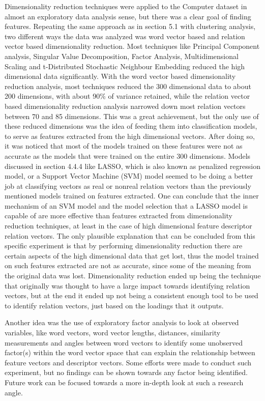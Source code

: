 \documentclass{sig-alternate}
\begin{document}
Dimensionality reduction techniques were applied to the Computer dataset in almost an exploratory data analysis sense, but there was a clear goal of finding features. Repeating the same approach as in section 5.1 with clustering analysis, two different ways the data was analyzed was word vector based and relation vector based dimensionality reduction. Most techniques like Principal Component analysis, Singular Value Decomposition, Factor Analysis, Multidimensional Scaling and t-Distributed Stochastic Neighbour Embedding reduced the high dimensional data significantly. With the word vector based dimensionality reduction analysis, most techniques reduced the 300 dimensional data to about 200 dimensions, with about 90\% of variance retained, while the relation vector based dimensionality reduction analysis narrowed down most relation vectors between 70 and 85 dimensions. This was a great achievement, but the only use of these reduced dimensions was the idea of feeding them into classification models, to serve as features extracted from the high dimensional vectors. After doing so, it was noticed that most of the models trained on these features were not as accurate as the models that were trained on the entire 300 dimensions. Models discussed in section 4.4.4 like LASSO, which is also known as penalized regression model, or a Support Vector Machine (SVM) model seemed to be doing a better job at classifying vectors as real or nonreal relation vectors than the previously mentioned models trained on features extracted. One can conclude that the inner mechanism of an SVM model and the model selection that a LASSO model is capable of are more effective than features extracted from dimensionality reduction techniques, at least in the case of high dimensional feature descriptor relation vectors. The only plausible explanation that can be concluded from this specific experiment is that by performing dimensionality reduction there are certain aspects of the high dimensional data that get lost, thus the model trained on such features extracted are not as accurate, since some of the meaning from the original data was lost. Dimensionality reduction ended up being the technique that originally was thought to have a large impact towards identifying relation vectors, but at the end it ended up not being a consistent enough tool to be used to identify relation vectors, just based on the loadings that it outputs.

Another idea was the use of exploratory factor analysis to look at observed variables, like word vectors, word vector lengths, distances, similarity measurements and angles between word vectors to identify some unobserved factor(s) within the word vector space that can explain the relationship between feature vectors and descriptor vectors. Some efforts were made to conduct such experiment, but no findings can be shown towards any factor being identified. Future work can be focused towards a more in-depth look at such a research angle.
\end{document}
